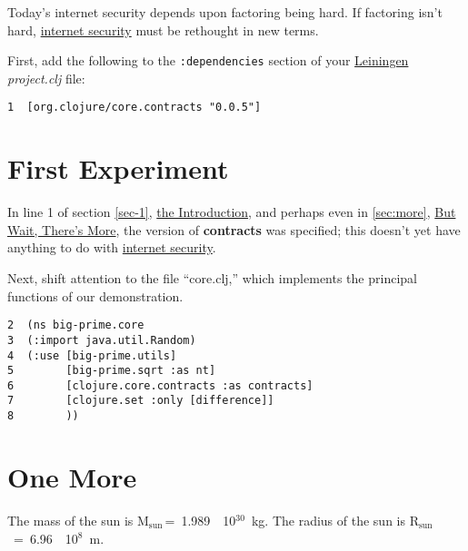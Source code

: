 \documentclass[11pt]{article}
\begin{document}
Today's \label{internet-security}internet security depends upon factoring being hard. If
factoring isn't hard, \hyperref[internet-security]{internet security} must be rethought in new
terms.

First, add the following to the \verb~:dependencies~ section of your \href{https://github.com/technomancy/leiningen}{Leiningen}
\emph{project.clj} file:

\begin{verbatim}
1  [org.clojure/core.contracts "0.0.5"]
\end{verbatim}
\section{First Experiment}
\label{sec-2}
In line 1 of section \ref{sec-1}, \hyperref[sec-1]{the Introduction}, and
perhaps even in \ref{sec:more}, \hyperref[sec:more]{But Wait, There's More}, the version of
\textbf{contracts} was specified; this doesn't yet have anything to do with
\hyperref[internet-security]{internet security}.

Next, shift attention to the file ``core.clj,'' which implements the
principal functions of our demonstration.

\begin{verbatim}
2  (ns big-prime.core
3  (:import java.util.Random)
4  (:use [big-prime.utils]
5        [big-prime.sqrt :as nt]
6        [clojure.core.contracts :as contracts]
7        [clojure.set :only [difference]]
8        ))
\end{verbatim}
\section{One More}
\label{sec-3}
\label{sec:more} 

The mass of the sun is M$_{\text{sun}~}$=~1.989~\texttimes{}~10$^{\text{30}}$~kg.  The radius of
the sun is R$_{\text{sun}}$~=~6.96~\texttimes{}~10$^{\text{8}}$~m.
\end{document}
